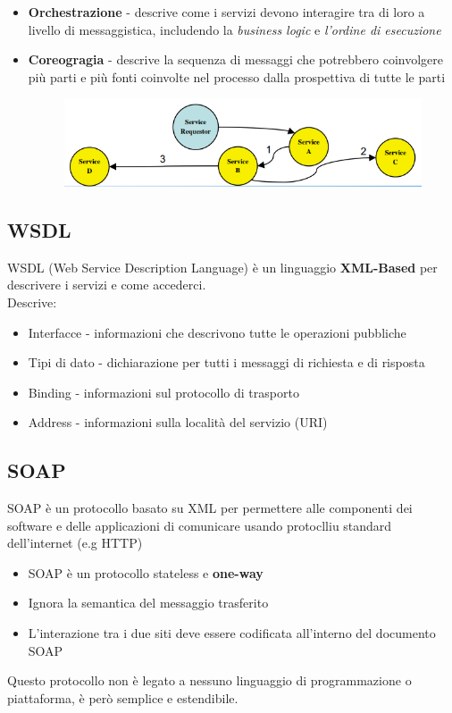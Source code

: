 \documentclass[12pt, a4paper]{article}
\begin{document}
    \begin{itemize}
        \item \textbf{Orchestrazione} - descrive come i servizi devono interagire tra di loro a livello di messaggistica, 
        includendo la \textit{business logic} e \textit{l'ordine di esecuzione}
        \item \textbf{Coreogragia} - descrive la sequenza di messaggi che potrebbero coinvolgere più parti e più fonti coinvolte nel processo
        dalla prospettiva di tutte le parti
        \begin{figure}[htbp]
            \centering
            \includegraphics[scale=0.7]{coreografia.png}
        \end{figure}
    \end{itemize}

    \subsection{WSDL}
    WSDL (Web Service Description Language) 
    è un linguaggio \textbf{XML-Based} per descrivere i servizi e come accederci.
    \\Descrive:
    \begin{itemize}
        \item Interfacce - informazioni che descrivono tutte le operazioni pubbliche
        \item Tipi di dato - dichiarazione per tutti i messaggi di richiesta e di risposta
        \item Binding - informazioni sul protocollo di trasporto
        \item Address - informazioni sulla località del servizio (URI)
    \end{itemize}

    \subsection{SOAP}
    SOAP è un protocollo basato su XML per permettere alle componenti dei software e delle applicazioni
    di comunicare usando protoclliu standard dell'internet (e.g HTTP)
    \begin{itemize}
        \item SOAP è un protocollo stateless e \textbf{one-way}
        \item Ignora la semantica del messaggio trasferito
        \item L'interazione tra i due siti deve essere codificata all'interno del documento SOAP
    \end{itemize}
    Questo protocollo non è legato a nessuno linguaggio di programmazione o piattaforma, è però semplice e estendibile.
\end{document}
